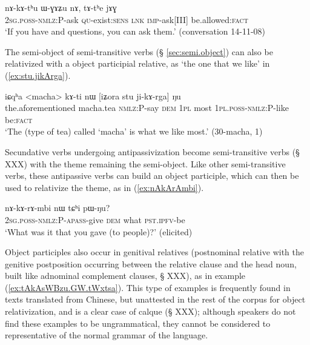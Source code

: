 \begin{exe}
\ex \label{ex:nAkAthu.WGAZu}
\gll nɤ-kɤ-tʰu ɯ-ɣɤʑu nɤ, tɤ-tʰe jɤɣ \\
\textsc{2sg}.\textsc{poss}-\textsc{nmlz}:P-ask \textsc{qu}-exist:\textsc{sens} \textsc{lnk} \textsc{imp}-ask[III] be.allowed:\textsc{fact} \\
\glt `If you have and questions, you can ask them.' (conversation 14-11-08)
\end{exe}

The semi-object of semi-transitive verbs (§ \ref{sec:semi.object}) can also be relativized with a object participial relative, as  `the one that we like' in (\ref{ex:stu.jikArga}).

\begin{exe}
\ex \label{ex:stu.jikArga}
\gll  iɕqʰa <macha> kɤ-ti nɯ [iʑora stu ji-kɤ-rga] ŋu \\
the.aforementioned macha.tea \textsc{nmlz}:P-say \textsc{dem} \textsc{1pl} most \textsc{1pl}.\textsc{poss}-\textsc{nmlz}:P-like be:\textsc{fact} \\
\glt `The (type of tea) called `macha' is what we like most.' (30-macha, 1)
\end{exe}

Secundative verbs undergoing antipassivization become semi-transitive verbs (§ XXX) with the theme remaining the semi-object. Like other semi-transitive verbs, these antipassive verbs can build an object participle, which can then be used to relativize the theme, as in (\ref{ex:nAkArAmbi}).

\begin{exe}
\ex \label{ex:nAkArAmbi}
\gll  nɤ-kɤ-rɤ-mbi nɯ tɕʰi pɯ-ŋu? \\
\textsc{2sg}.\textsc{poss}-\textsc{nmlz}:P-\textsc{apass}-give \textsc{dem} what \textsc{pst}.\textsc{ipfv}-be \\
\glt `What was it that you gave (to people)?' (elicited)
\end{exe}

Object participles also occur in genitival relatives (postnominal relative with the genitive postposition  occurring between the relative clause and the head noun, built like adnominal complement clauses, § XXX), as in example (\ref{ex:tAkAsWBzu.GW.tWxtsa}). This type of examples is frequently found in texts translated from Chinese, but unattested in the rest of the corpus for object relativization, and is a clear case of calque (§ XXX); although speakers do not find these examples to be ungrammatical, they cannot be considered to representative of the normal grammar of the language.

